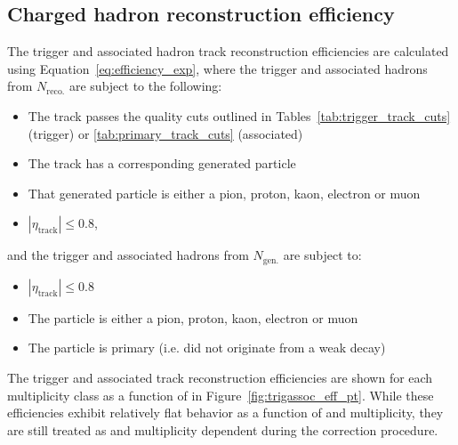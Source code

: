 \subsection{Charged hadron reconstruction efficiency}

The trigger and associated hadron track reconstruction efficiencies are calculated using Equation~\ref{eq:efficiency_exp}, where the trigger and associated hadrons from $N_{\text{reco.}}$ are subject to the following:
%
\begin{itemize}
	\item The track passes the quality cuts outlined in Tables~\ref{tab:trigger_track_cuts} (trigger) or \ref{tab:primary_track_cuts} (associated)
	\item The track has a corresponding generated particle
	\item That generated particle is either a pion, proton, kaon, electron or muon
	\item $|\eta_{\text{track}}| \leq 0.8$,
\end{itemize}
%
and the trigger and associated hadrons from $N_{\text{gen.}}$ are subject to:
%
\begin{itemize}
	\item $|\eta_{\text{track}}| \leq 0.8$
	\item The particle is either a pion, proton, kaon, electron or muon
	\item The particle is primary (i.e. did not originate from a weak decay)
\end{itemize}
%
The trigger and associated track reconstruction efficiencies are shown for each multiplicity class as a function of \pt in Figure~\ref{fig:trigassoc_eff_pt}. While these efficiencies exhibit relatively flat behavior as a function of \pt and multiplicity, they are still treated as \pt and multiplicity dependent during the correction procedure.

